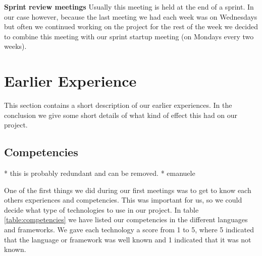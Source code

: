 \textbf{Sprint review meetings}\newline
Usually this meeting is held at the end of a sprint. In our case however, because the last meeting we had each
week was on Wednesdays but often we continued working on the project for the rest of the week we decided to
combine this meeting with our sprint startup meeting (on Mondays every two weeks).




\iffalse
\section{Earlier Experience}
\label{section:earlier-experience}

This section contains a short description of our earlier experiences.
In the conclusion we give some short details of what kind of effect this had on our project.

\subsection{Competencies}

* this is probably redundant and can be removed. *  emanuele

One of the first things we did during our first meetings was to get to know each others experiences and competencies.
This was important for us, so we could decide what type of technologies to use in our project.
In table \ref{table:competencies} we have listed our competencies in the different languages and frameworks.
We gave each technology a score from 1 to 5, where 5 indicated that the language or framework was well known and 1 indicated that it was not known.

